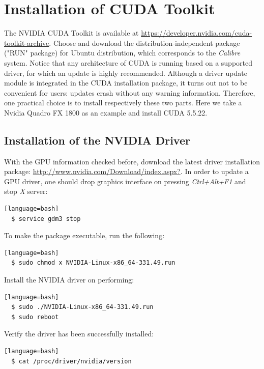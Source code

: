 \section{Installation of CUDA Toolkit}
The NVIDIA CUDA Toolkit is available at \href{https://developer.nvidia.com/cuda-toolkit-archive}{https://developer.nvidia.com/cuda-toolkit-archive}. Choose and download the distribution-independent package ("RUN" package) for Ubuntu distribution, which corresponds to the \textit{Calibre} system. Notice that any architecture of CUDA is running based on a supported driver, for which an update is highly recommended. Although a driver update module is integrated in the CUDA installation package, it turns out not to be convenient for users: updates crash without any warning information. Therefore, one practical choice is to install respectively these two parts. Here we take a Nvidia Quadro FX 1800 as an example and install CUDA 5.5.22.

\subsection{Installation of the NVIDIA Driver}
With the GPU information checked before, download the latest driver installation package: \href{http://www.nvidia.com/Download/index.aspx?}{http://www.nvidia.com/Download/index.aspx?}. In order to update a GPU driver, one should drop graphics interface on pressing \textit{Ctrl+Alt+F1} and stop \textit{X} server:
\begin{lstlisting}[style=DOS][language=bash]
  $ service gdm3 stop
\end{lstlisting}
To make the package executable, run the following:
\begin{lstlisting}[style=DOS][language=bash]
  $ sudo chmod x NVIDIA-Linux-x86_64-331.49.run
\end{lstlisting}
Install the NVIDIA driver on performing:
\begin{lstlisting}[style=DOS][language=bash]
  $ sudo ./NVIDIA-Linux-x86_64-331.49.run
  $ sudo reboot
\end{lstlisting}
Verify the driver has been successfully installed:
\begin{lstlisting}[style=DOS][language=bash]
  $ cat /proc/driver/nvidia/version
\end{lstlisting}


